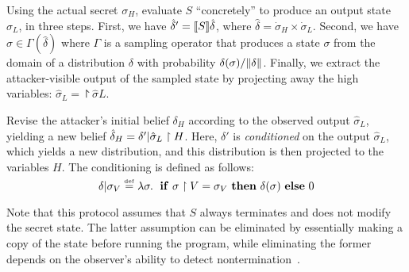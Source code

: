  Using the actual
secret $\sigma_H$, evaluate $S$ ``concretely'' to produce an output
state $\hat{\sigma}_L$, in three steps. 
First, we have $\hat{\delta}' = [\![{S}]\!]{\hat{\delta}}$, where
$\hat{\delta} = \dot{\sigma}_H \times \dot{\sigma}_L $.  
Second, we
have $\hat{\sigma} \in \Gamma(\hat{\delta})$ where $\Gamma$ is a sampling
operator that produces a state $\sigma$ from the domain of a
distribution $\delta$ with probability $\delta(\sigma) /
\mathord{\parallel}\delta\mathord{\parallel}$. Finally, we extract the attacker-visible output of
the sampled state by projecting away the high variables:
$\hat{\sigma}_L = \project{\hat{\sigma}}{L}$.  

 Revise the attacker's initial belief $\delta_H$
according to the observed output $\hat{\sigma}_L$, yielding a new
belief $\hat{\delta}_H =
\delta' | \hat{\sigma}_L \upharpoonright H$.  Here, $\delta'$ is
\emph{conditioned} on the output $\hat{\sigma}_L$, which yields a new
distribution, and this distribution is then projected to the variables
$H$.  The conditioning is defined as follows:
$$ \delta | \sigma_V \stackrel{\smash{\scriptscriptstyle \mathrm{def}}}= \lambda \sigma
. \; \text{ \textbf{if} } \sigma \upharpoonright V = \sigma_V \text{ \textbf{then} } \delta (\sigma) \text{ \textbf{else} } 0 $$

\ifacita
\else
Note that this protocol assumes that $S$ always terminates and does not
modify the secret state.  The latter assumption can be eliminated by
essentially making a copy of the state before running the program, while
eliminating the former depends on the observer's ability to detect
nontermination~\cite{clarkson09quantifying}.
\fi




